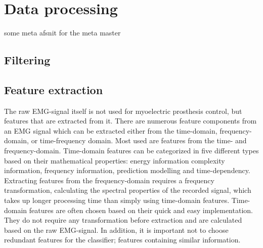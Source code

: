 \section{Data processing}

some meta afsnit for the meta master 

\subsection{Filtering}


\subsection{Feature extraction}

The raw EMG-signal itself is not used for myoelectric prosthesis control, but features that are extracted from it. %
There are numerous feature components from an EMG signal which can be extracted either from the time-domain, frequency-domain, or time-frequency domain. Most used are features from the time- and frequency-domain. Time-domain features can be categorized in five different types based on their mathematical properties: energy information complexity information, frequency information, prediction modelling and time-dependency. Extracting features from the frequency-domain requires a frequency transformation, calculating the spectral properties of the recorded signal, which takes up longer processing time than simply using time-domain features. 
Time-domain features are often chosen based on their quick and easy implementation. They do not require any transformation before extraction and are calculated based on the raw EMG-signal. In addition, it is important not to choose redundant features for the classifier; features containing similar information. \cite{Phiny2012} 